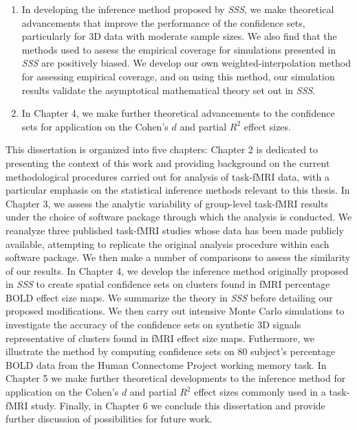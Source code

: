 \begin{enumerate}
\item In developing the inference method proposed by \textit{SSS}, we make theoretical advancements that improve the performance of the confidence sets, particularly for 3D data with moderate sample sizes. We also find that the methods used to assess the empirical coverage for simulations presented in \textit{SSS} are positively biased. We develop our own weighted-interpolation method for assessing empirical coverage, and on using this method, our simulation results validate the asymptotical mathematical theory set out in \textit{SSS}. 

\item In Chapter 4, we make further theoretical advancements to the confidence sets for application on the Cohen's $d$ and partial $R^{2}$ effect sizes.

\end{enumerate}


This dissertation is organized into five chapters: Chapter 2 is dedicated to presenting the context of this work and providing background on the current methodological procedures carried out for analysis of task-fMRI data, with a particular emphasis on the statistical inference methods relevant to this thesis. In Chapter 3, we assess the analytic variability of group-level task-fMRI results under the choice of software package through which the analysis is conducted. We reanalyze three published task-fMRI studies whose data has been made publicly available, attempting to replicate the original analysis procedure within each software package. We then make a number of comparisons to assess the similarity of our results. In Chapter 4, we develop the inference method originally proposed in \textit{SSS} to create spatial confidence sets on clusters found in fMRI percentage BOLD effect size maps. We summarize the theory in \textit{SSS} before detailing our proposed modifications. We then carry out intensive Monte Carlo simulations to investigate the accuracy of the confidence sets on synthetic 3D signals representative of clusters found in fMRI effect size maps. Futhermore, we illustrate the method by computing confidence sets on 80 subject's percentage BOLD data from the Human Connectome Project working memory task.
In Chapter 5 we make further theoretical developments to the inference method for application on the Cohen's $d$ and partial $R^{2}$ effect sizes commonly used in a task-fMRI study. Finally, in Chapter 6 we conclude this dissertation and provide further discussion of possibilities for future work. 

